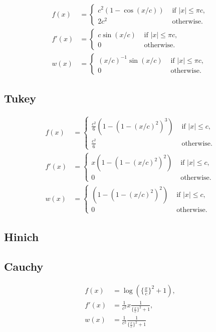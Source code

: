 \documentclass[
  12pt,
  letterpaper,
  DIV=11,
  numbers=noendperiod]{scrartcl}
\theoremstyle{plain}
\theoremstyle{remark}
\begin{document}
\begin{align}
f(x)&=\begin{cases}
c^2(1-\cos(x/c))&\text{ if }|x|\leq\pi c,\\
2c^2&\text{ otherwise.}
\end{cases}\\
f'(x)&=\begin{cases}
c\sin(x/c)&\text{ if }|x|\leq\pi c,\\
0&\text{ otherwise.}
\end{cases}\\
w(x)&=\begin{cases}
(x/c)^{-1}\sin(x/c)&\text{ if }|x|\leq\pi c,\\
0&\text{ otherwise.}
\end{cases}
\end{align}

\subsection{Tukey}\label{tukey}

\begin{align}
f(x)&=\begin{cases}
\frac{c^2}{6}\left(1-\left(1-(x/c)^2\right)^3\right)&\text{ if } |x|\leq c,\\
\frac{c^2}{6}&\text{ otherwise}.
\end{cases}\\
f'(x)&=\begin{cases}
x\left(1-\left(1-(x/c)^2\right)^2\right)&\text{ if } |x|\leq c,\\
0&\text{ otherwise}.
\end{cases}\\
w(x)&=\begin{cases}
\left(1-\left(1-(x/c)^2\right)^2\right)&\text{ if } |x|\leq c,\\
0&\text{ otherwise}.
\end{cases}
\end{align}

\subsection{Hinich}\label{hinich}

\subsection{Cauchy}\label{cauchy}

\begin{align}
f(x)&=\log(\{\frac{x}{c}\}^2+1),\\
f'(x)&=\frac{1}{c^2}x\frac{1}{\{\frac{x}{c}\}^2+1},\\
w(x)&=\frac{1}{c^2}\frac{1}{\{\frac{x}{c}\}^2+1}
\end{align}
\end{document}
